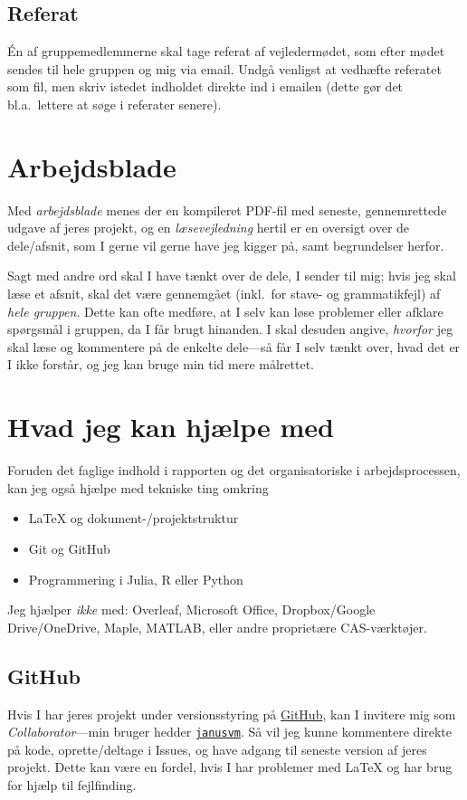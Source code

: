 \documentclass[12pt,oneside,final]{article}
\begin{document}
\subsection{Referat}
\'En af gruppemedlemmerne skal tage referat af vejledermødet, som efter mødet sendes til hele gruppen og mig via email.
Undgå venligst at vedhæfte referatet som fil, men skriv istedet indholdet direkte ind i emailen (dette gør det bl.a.\ lettere at søge i referater senere).


\section{Arbejdsblade}
\label{sec:arbejdsblade}
Med \emph{arbejdsblade} menes der en kompileret PDF-fil med seneste, gennemrettede udgave af jeres projekt, og en \emph{læsevejledning} hertil er en oversigt over de dele/afsnit, som I gerne vil gerne have jeg kigger på, samt begrundelser herfor.

Sagt med andre ord skal I have tænkt over de dele, I sender til mig;
hvis jeg skal læse et afsnit, skal det være gennemgået (inkl.\ for stave- og grammatikfejl) af \emph{hele gruppen}.
Dette kan ofte medføre, at I selv kan løse problemer eller afklare spørgsmål i gruppen, da I får brugt hinanden.
I skal desuden angive, \emph{hvorfor} jeg skal læse og kommentere på de enkelte dele---så får I selv tænkt over, hvad det er I ikke forstår, og jeg kan bruge min tid mere målrettet.


\section{Hvad jeg kan hjælpe med}
Foruden det faglige indhold i rapporten og det organisatoriske i arbejdsprocessen, kan jeg også hjælpe med tekniske ting omkring
\begin{itemize}
\item \LaTeX{} og dokument-/projektstruktur
\item Git og GitHub
\item Programmering i Julia, R eller Python
\end{itemize}
Jeg hjælper \emph{ikke} med: Overleaf, Microsoft Office, Dropbox/Google Drive/OneDrive, Maple, MATLAB, eller andre proprietære CAS-værktøjer.

\subsection{GitHub}
Hvis I har jeres projekt under versionsstyring på \href{https://github.com}{GitHub}, kan I invitere mig som \emph{Collaborator}---min bruger hedder \href{https://github.com/janusvm}{\texttt{janusvm}}.
Så vil jeg kunne kommentere direkte på kode, oprette/deltage i Issues, og have adgang til seneste version af jeres projekt.
Dette kan være en fordel, hvis I har problemer med \LaTeX{} og har brug for hjælp til fejlfinding.
\end{document}
